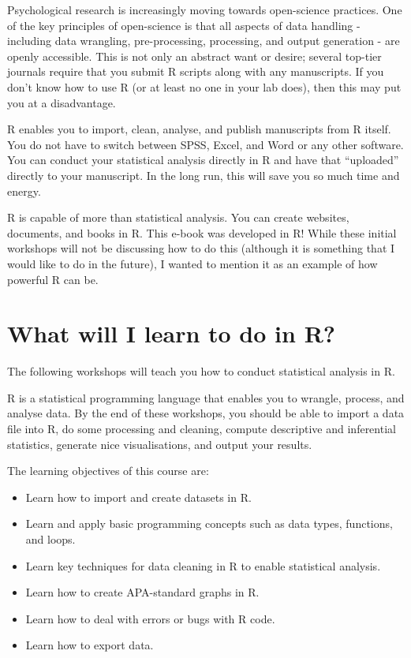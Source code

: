 \documentclass[
]{book}
\begin{document}
Psychological research is increasingly moving towards open-science practices. One of the key principles of open-science is that all aspects of data handling - including data wrangling, pre-processing, processing, and output generation - are openly accessible. This is not only an abstract want or desire; several top-tier journals require that you submit R scripts along with any manuscripts. If you don't know how to use R (or at least no one in your lab does), then this may put you at a disadvantage.

R enables you to import, clean, analyse, and publish manuscripts from R itself. You do not have to switch between SPSS, Excel, and Word or any other software. You can conduct your statistical analysis directly in R and have that ``uploaded'' directly to your manuscript. In the long run, this will save you so much time and energy.

R is capable of more than statistical analysis. You can create websites, documents, and books in R. This e-book was developed in R! While these initial workshops will not be discussing how to do this (although it is something that I would like to do in the future), I wanted to mention it as an example of how powerful R can be.

\hypertarget{what-will-i-learn-to-do-in-r}{%
\section{What will I learn to do in R?}\label{what-will-i-learn-to-do-in-r}}

The following workshops will teach you how to conduct statistical analysis in R.

R is a statistical programming language that enables you to wrangle, process, and analyse data. By the end of these workshops, you should be able to import a data file into R, do some processing and cleaning, compute descriptive and inferential statistics, generate nice visualisations, and output your results.

The learning objectives of this course are:

\begin{itemize}
\item
  Learn how to import and create datasets in R.
\item
  Learn and apply basic programming concepts such as data types, functions, and loops.
\item
  Learn key techniques for data cleaning in R to enable statistical analysis.
\item
  Learn how to create APA-standard graphs in R.
\item
  Learn how to deal with errors or bugs with R code.
\item
  Learn how to export data.
\end{itemize}
\end{document}
